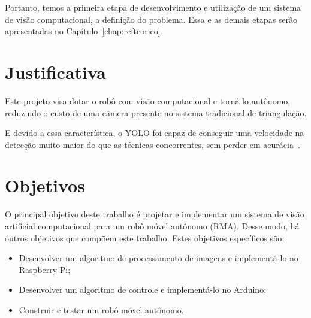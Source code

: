 Portanto, temos a primeira etapa de desenvolvimento e utilização de um sistema de visão computacional, a definição do problema. Essa e as demais etapas serão apresentadas no Capítulo~\ref{chap:refteorico}.

\section{Justificativa}
\label{sec:justi}

Este projeto visa dotar o robô com visão computacional e torná-lo autônomo, reduzindo o custo de uma câmera presente no sistema tradicional de triangulação.

E devido a essa característica, o YOLO foi capaz de conseguir uma velocidade na detecção muito maior do que as técnicas concorrentes, sem perder em acurácia~\cite{alvesGabriel2020}.

\section{Objetivos}
\label{sec:objt}

O principal objetivo deste trabalho é projetar e implementar um sistema de visão artificial computacional para um robô móvel autônomo (RMA). Desse modo, há outros objetivos que compõem este trabalho. Estes objetivos específicos são:

\begin{itemize}
    \item Desenvolver um algoritmo de processamento de imagens e implementá-lo no Raspberry Pi;
    \item Desenvolver um algoritmo de controle e implementá-lo no Arduino;
    \item Construir e testar um robô móvel autônomo.
\end{itemize}







